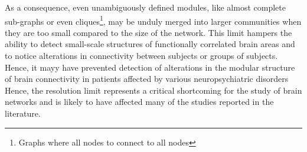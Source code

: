 As a consequence, even unambiguously defined modules, like almost complete sub-graphs or even cliques\footnote{Graphs where all nodes to connect to all nodes}, may be unduly merged into larger communities when they are too small compared to the size of the network.
This limit hampers the ability to detect small-scale structures of functionally correlated brain areas and to notice alterations in connectivity between subjects or groups of subjects. Hence, it mayy have prevented detection of alterations in the modular structure of brain connectivity in patients affected by various neuropsychiatric disorders
Hence, the resolution limit represents a critical shortcoming for the study of brain networks and is likely to have affected many of the studies reported in the literature.

